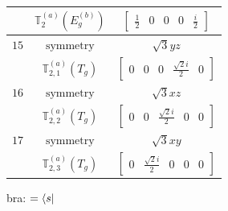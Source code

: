 \documentclass[fleqn,8pt,landscape]{jsarticle}
\begin{document}
\begin{longtable}{ccc}
$  $ & $ \mathbb{T}_{2}^{(a)}(E_{g}^{(b)}) $ & $ \begin{bmatrix} \frac{1}{2} & 0 & 0 & 0 & \frac{i}{2} \end{bmatrix} $ \\ \hline
$ 15 $ & $ \text{symmetry} $ & $ \sqrt{3} y z $ \\
$  $ & $ \mathbb{T}_{2,1}^{(a)}(T_{g}) $ & $ \begin{bmatrix} 0 & 0 & 0 & \frac{\sqrt{2} i}{2} & 0 \end{bmatrix} $ \\ \hline
$ 16 $ & $ \text{symmetry} $ & $ \sqrt{3} x z $ \\
$  $ & $ \mathbb{T}_{2,2}^{(a)}(T_{g}) $ & $ \begin{bmatrix} 0 & 0 & \frac{\sqrt{2} i}{2} & 0 & 0 \end{bmatrix} $ \\ \hline
$ 17 $ & $ \text{symmetry} $ & $ \sqrt{3} x y $ \\
$  $ & $ \mathbb{T}_{2,3}^{(a)}(T_{g}) $ & $ \begin{bmatrix} 0 & \frac{\sqrt{2} i}{2} & 0 & 0 & 0 \end{bmatrix} $ \\ \hline
\end{longtable}
bra: $=\bra{s}$
\end{document}
